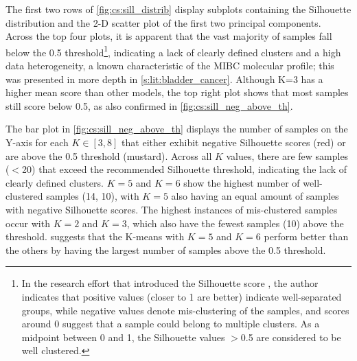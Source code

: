 The first two rows of \cref{fig:cs:sill_distrib} display subplots containing the Silhouette distribution and the 2-D scatter plot of the first two principal components. Across the top four plots, it is apparent that the vast majority of samples fall below the 0.5 threshold\footnote{In the research effort that introduced the Silhouette score \citep{Rousseeuw1987-wy}, the author indicates that positive values (closer to 1 are better) indicate well-separated groups, while negative values denote mis-clustering of the samples, and scores around 0 suggest that a sample could belong to multiple clusters. As a midpoint between 0 and 1, the Silhouette values $>$0.5 are considered to be well clustered.}, indicating a lack of clearly defined clusters and a high data heterogeneity, a known characteristic of the MIBC molecular profile; this was presented in more depth in \cref{s:lit:bladder_cancer}. Although K=3 has a higher mean score than other models, the top right plot shows that most samples still score below 0.5, as also confirmed in \cref{fig:cs:sill_neg_above_th}.


The bar plot in \cref{fig:cs:sill_neg_above_th} displays the number of samples on the Y-axis for each $K \in [3, 8]$ that either exhibit negative Silhouette scores (red) or are above the 0.5 threshold (mustard). Across all $K$ values, there are few samples ($<$20) that exceed the recommended Silhouette threshold, indicating the lack of clearly defined clusters. $K=5$ and $K=6$ show the highest number of well-clustered samples (14, 10), with $K=5$ also having an equal amount of samples with negative Silhouette scores. The highest instances of mis-clustered samples occur with $K=2$ and $K=3$, which also have the fewest samples (10) above the threshold.  suggests that the K-means with $K=5$ and $K=6$ perform better than the others by having the largest number of samples above the 0.5 threshold.


